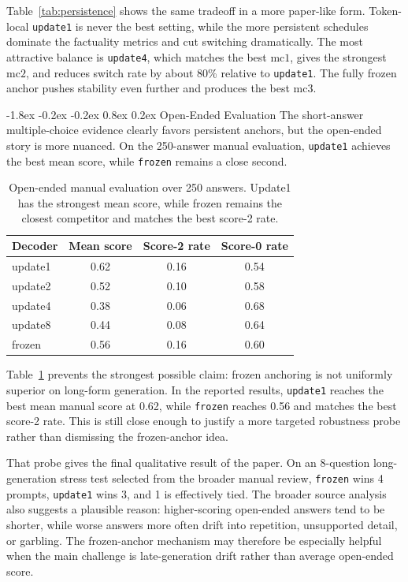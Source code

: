 \documentclass[10pt,twocolumn]{article}
\makeatletter
\renewcommand\section{\@startsection{section}{1}{\z@}%
  {-1.8ex \@plus -0.2ex \@minus -0.2ex}%
  {0.8ex \@plus 0.2ex}%
  {\large\bfseries}}
\makeatother
\begin{document}
Table~\ref{tab:persistence} shows the same tradeoff in a more paper-like form. Token-local \texttt{update1} is never the best setting, while the more persistent schedules dominate the factuality metrics and cut switching dramatically. The most attractive balance is \texttt{update4}, which matches the best $\mathrm{mc1}$, gives the strongest $\mathrm{mc2}$, and reduces switch rate by about 80\% relative to \texttt{update1}. The fully frozen anchor pushes stability even further and produces the best $\mathrm{mc3}$.

\section{Open-Ended Evaluation}
The short-answer multiple-choice evidence clearly favors persistent anchors, but the open-ended story is more nuanced. On the 250-answer manual evaluation, \texttt{update1} achieves the best mean score, while \texttt{frozen} remains a close second.

\begin{table}[!b]
    \centering
    \small
    \begin{tabular}{lccc}
        \toprule
        Decoder & Mean score & Score-2 rate & Score-0 rate \\
        \midrule
        update1 & 0.62 & 0.16 & 0.54 \\
        update2 & 0.52 & 0.10 & 0.58 \\
        update4 & 0.38 & 0.06 & 0.68 \\
        update8 & 0.44 & 0.08 & 0.64 \\
        frozen & 0.56 & 0.16 & 0.60 \\
        \bottomrule
    \end{tabular}
    \caption{Open-ended manual evaluation over 250 answers. Update1 has the strongest mean score, while frozen remains the closest competitor and matches the best score-2 rate.}
    \label{tab:openended}
\end{table}

Table~\ref{tab:openended} prevents the strongest possible claim: frozen anchoring is not uniformly superior on long-form generation. In the reported results, \texttt{update1} reaches the best mean manual score at 0.62, while \texttt{frozen} reaches 0.56 and matches the best score-2 rate. This is still close enough to justify a more targeted robustness probe rather than dismissing the frozen-anchor idea.

That probe gives the final qualitative result of the paper. On an 8-question long-generation stress test selected from the broader manual review, \texttt{frozen} wins 4 prompts, \texttt{update1} wins 3, and 1 is effectively tied. The broader source analysis also suggests a plausible reason: higher-scoring open-ended answers tend to be shorter, while worse answers more often drift into repetition, unsupported detail, or garbling. The frozen-anchor mechanism may therefore be especially helpful when the main challenge is late-generation drift rather than average open-ended score.
\end{document}
